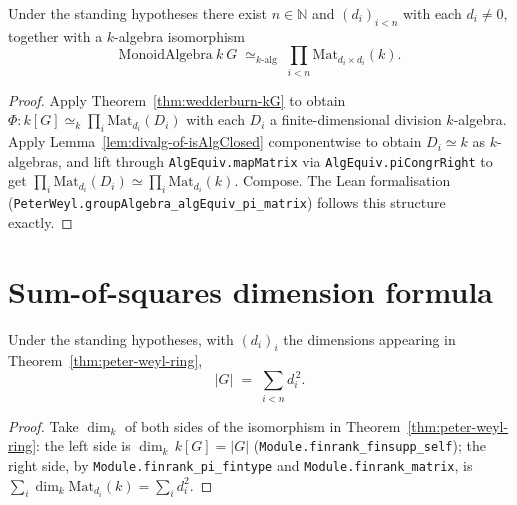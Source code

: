 \begin{theorem}
  \label{thm:peter-weyl-ring}
  \leanok
  Under the standing hypotheses there exist $n \in \mathbb N$ and
  $(d_i)_{i < n}$ with each $d_i \ne 0$, together with a $k$-algebra
  isomorphism
  \[
     \mathrm{MonoidAlgebra}\ k\ G \;\simeq_{k\text{-alg}}\;
     \prod_{i < n} \mathrm{Mat}_{d_i \times d_i}(k).
  \]
\end{theorem}

\begin{proof}
  \leanok
  Apply Theorem~\ref{thm:wedderburn-kG} to obtain
  $\Phi : k[G] \simeq_{\!k} \prod_i \mathrm{Mat}_{d_i}(D_i)$ with each $D_i$
  a finite-dimensional division $k$-algebra. Apply
  Lemma~\ref{lem:divalg-of-isAlgClosed} componentwise to obtain $D_i \simeq k$
  as $k$-algebras, and lift through \texttt{AlgEquiv.mapMatrix} via
  \texttt{AlgEquiv.piCongrRight} to get
  $\prod_i \mathrm{Mat}_{d_i}(D_i) \simeq \prod_i \mathrm{Mat}_{d_i}(k)$.
  Compose. The Lean formalisation
  (\texttt{PeterWeyl.groupAlgebra\_algEquiv\_pi\_matrix}) follows this
  structure exactly.
\end{proof}

\section{Sum-of-squares dimension formula}

\begin{corollary}
  \label{cor:sum-of-squares}
  \leanok
  Under the standing hypotheses, with $(d_i)_i$ the dimensions appearing in
  Theorem~\ref{thm:peter-weyl-ring},
  \[
     |G| \;=\; \sum_{i < n} d_i^{\,2}.
  \]
\end{corollary}

\begin{proof}
  \leanok
  Take $\dim_k$ of both sides of the isomorphism in
  Theorem~\ref{thm:peter-weyl-ring}: the left side is
  $\dim_k\,k[G] = |G|$ (\texttt{Module.finrank\_finsupp\_self}); the right
  side, by \texttt{Module.finrank\_pi\_fintype} and
  \texttt{Module.finrank\_matrix}, is
  $\sum_i \dim_k \mathrm{Mat}_{d_i}(k) = \sum_i d_i^2$.
\end{proof}

